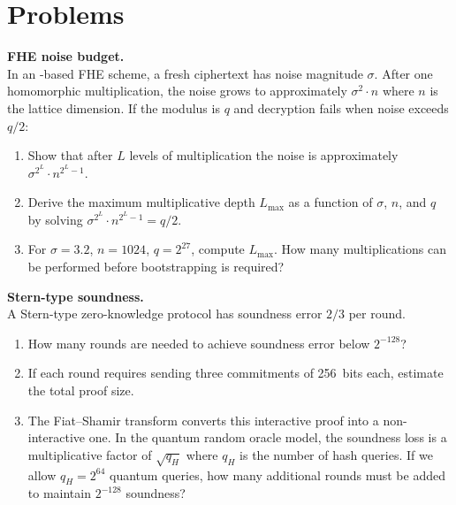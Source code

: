 \section*{Problems}

\begin{prob}
\label{prob:ch14-fhe}
\textbf{FHE noise budget.}\\
In an \lwe{}-based FHE scheme, a fresh ciphertext has noise magnitude $\sigma$.  After one homomorphic multiplication, the noise grows to approximately $\sigma^2 \cdot n$ where $n$ is the lattice dimension.  If the modulus is $q$ and decryption fails when noise exceeds $q/2$:
\begin{enumerate}
\item[(a)] Show that after $L$ levels of multiplication the noise is approximately $\sigma^{2^L} \cdot n^{2^L - 1}$.
\item[(b)] Derive the maximum multiplicative depth $L_{\max}$ as a function of $\sigma$, $n$, and $q$ by solving $\sigma^{2^L} \cdot n^{2^L - 1} = q/2$.
\item[(c)] For $\sigma = 3.2$, $n = 1024$, $q = 2^{27}$, compute $L_{\max}$.  How many multiplications can be performed before bootstrapping is required?
\end{enumerate}
\end{prob}

\begin{prob}
\label{prob:ch14-zkp}
\textbf{Stern-type soundness.}\\
A Stern-type zero-knowledge protocol has soundness error $2/3$ per round.
\begin{enumerate}
\item[(a)] How many rounds are needed to achieve soundness error below $2^{-128}$?
\item[(b)] If each round requires sending three commitments of 256~bits each, estimate the total proof size.
\item[(c)] The Fiat--Shamir transform converts this interactive proof into a non-interactive one.  In the quantum random oracle model, the soundness loss is a multiplicative factor of $\sqrt{q_H}$ where $q_H$ is the number of hash queries.  If we allow $q_H = 2^{64}$ quantum queries, how many additional rounds must be added to maintain $2^{-128}$ soundness?
\end{enumerate}
\end{prob}

